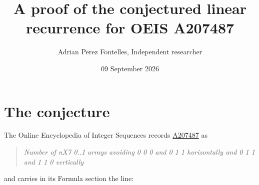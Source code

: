 \documentclass[11pt]{article}
\title{A proof of the conjectured linear recurrence for OEIS A207487}
\author{Adrian Perez Fontelles, Independent researcher}
\date{09 September 2026}
\theoremstyle{definition}
\begin{document}
\maketitle
\section{The conjecture}

The Online Encyclopedia of Integer Sequences records \href{https://oeis.org/A207487}{A207487} as

\begin{quote}\itshape Number of nX7 0..1 arrays avoiding 0 0 0 and 0 1 1 horizontally and 0 1 1 and 1 1 0 vertically\end{quote}

and carries in its Formula section the line:
\end{document}
